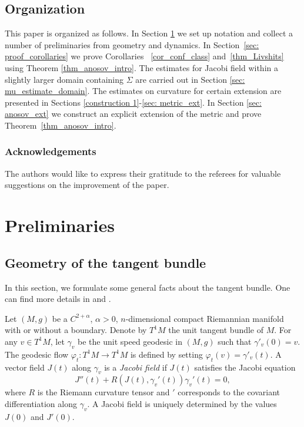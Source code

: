 \documentclass[JEP,XML,SOM,Unicode,NoFloatCountersInSection]{cedram}
\theoremstyle{definition}
\let\phi\varphi
\renewcommand{\>}{{\rangle}}
\newcommand{\<}{{\langle}}
\begin{document}
\subsection{Organization} This paper is organized as follows. In Section \ref{sec: prelim} we set up notation and collect a number of preliminaries from geometry and dynamics. In Section~\ref{sec: proof_corollaries} we prove Corollaries ~\ref{cor_conf_class} and~\ref{thm_Livshits} using Theorem \ref{thm_anosov_intro}. The estimates for Jacobi field within a slightly larger domain containing $\Sigma$ are carried out in Section \ref{sec: mu_estimate_domain}. The estimates on curvature for certain extension are presented in Sections \ref{construction 1}-\ref{sec: metric_ext}. In Section \ref{sec: anosov_ext} we construct an explicit extension of the metric and prove Theorem~\ref{thm_anosov_intro}.

\subsubsection*{Acknowledgements} The authors would like to express their gratitude to the referees for valuable suggestions on the improvement of the paper.

\section{Preliminaries}\label{sec: prelim}

\subsection{Geometry of the tangent bundle}\label{section: geometry tangent bundle}

In this section, we formulate some general facts about the tangent bundle. One can find more details in \cite{E73} and \cite{EO80}.

Let $(M,g)$ be a $C^{2+\alpha}$, $\alpha>0$, $n$-dimensional compact Riemannian manifold with or without a boundary. Denote by $T^1 M$ the unit tangent bundle of $M$. For any $v\in T^1M$, let $\gamma_{v}$ be the unit speed geodesic in $(M,g)$ such that $\gamma'_{v}(0)=v$. The geodesic flow $\phi_t: T^1M\to T^1M$ is defined by setting $\phi_t(v)=\gamma'_{v}(t)$. A vector field $J(t)$ along $\gamma_v$ is a \textit{Jacobi field} if $J(t)$ satisfies the Jacobi equation
\begin{equation}\label{Jacobi_equation}
J''(t)+R({J(t), \gamma_v'(t)})\gamma_v'(t)=0,
\end{equation}
where $R$ is the Riemann curvature tensor and $'$ corresponds to the covariant differentiation along $\gamma_v$. A Jacobi field is uniquely determined by the values $J(0)$ and $J'(0)$.
\end{document}
